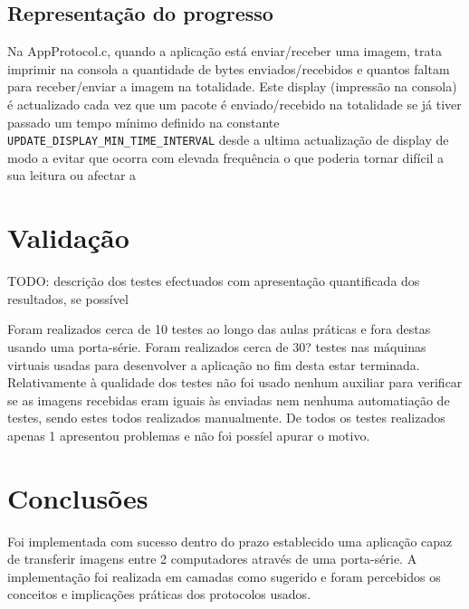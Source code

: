 \documentclass[11pt,a4paper,reqno]{report}
\numberwithin{equation}{section}
\begin{document}
\section{Representação do progresso}
Na AppProtocol.c, quando a aplicação está enviar/receber uma imagem, trata imprimir na consola a quantidade de bytes enviados/recebidos e quantos faltam para receber/enviar a imagem na totalidade. Este display (impressão na consola) é actualizado cada vez que um pacote é enviado/recebido na totalidade se já tiver passado um tempo mínimo definido na constante \verb|UPDATE_DISPLAY_MIN_TIME_INTERVAL| desde a ultima actualização de display de modo a evitar que ocorra com elevada frequência o que poderia tornar difícil a sua leitura ou afectar a

\chapter{Validação}

TODO: descrição dos testes efectuados com apresentação quantificada dos resultados, se possível

Foram realizados cerca de 10 testes ao longo das aulas práticas e fora destas usando uma porta-série.
Foram realizados cerca de 30? testes nas máquinas virtuais usadas para desenvolver a aplicação no fim desta estar terminada.
Relativamente à qualidade dos testes não foi usado nenhum auxiliar para verificar se as imagens recebidas eram iguais às enviadas nem nenhuma automatiação de testes, sendo estes todos realizados manualmente. 
De todos os testes realizados apenas 1 apresentou problemas e não foi possíel apurar o motivo.

\chapter{Conclusões}

Foi implementada com sucesso dentro do prazo establecido uma aplicação capaz de transferir imagens entre 2 computadores através de uma porta-série.
A implementação foi realizada em camadas como sugerido e foram percebidos os conceitos e implicações práticas dos protocolos usados.




\end{document}
